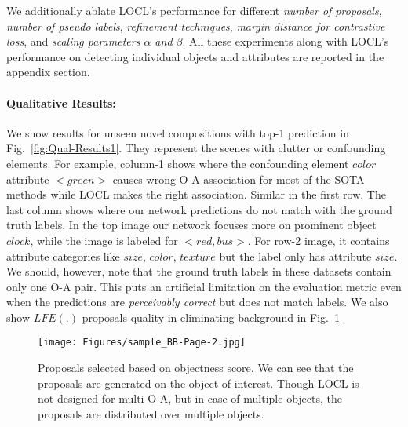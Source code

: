\documentclass{bmvc2k}
\begin{document}
We additionally ablate LOCL's performance for different \textit{number of proposals}, \textit{number of pseudo labels}, \textit{refinement techniques}, \textit{margin distance for contrastive loss}, and \textit{scaling parameters $\alpha$ and $\beta$}. All these experiments along with LOCL's performance on detecting individual objects and attributes are reported in the appendix section. 





\vspace{-0.3cm}
\paragraph{Qualitative Results:}
We show results for unseen novel compositions with top-1 prediction in Fig.~\ref{fig:Qual-Results1}. They represent the scenes with clutter or confounding elements.
For example, column-1 shows where the confounding element $color$ attribute $<green>$ causes wrong O-A association for most of the SOTA methods while LOCL makes the right association. Similar in the first row.
The last column shows where our network predictions do not match with the ground truth labels. 
In the top image our network focuses more on prominent object $clock$, while the image is labeled for $<red, bus>$.
For row-2 image, it contains attribute categories like $size$, $color$, $texture$ but the label only has attribute $size$. We should, however, note that the ground truth labels in these datasets contain only one O-A pair. 
This puts an artificial limitation on the evaluation metric even when the predictions are \textit{perceivably correct} but does not match labels.
We also show $LFE(.)$ proposals quality in eliminating background in Fig.~\ref{fig:samplebb2}

\vspace{-0.2cm}
\begin{figure}[t]
\begin{center}
\texttt{[image: Figures/sample\_BB-Page-2.jpg]}
\end{center}
  \vspace{-0.25in}
   \caption{Proposals selected based on objectness score. We can see that the proposals are generated on the object of interest. Though LOCL is not designed for multi O-A, but in case of multiple objects, the proposals are distributed over multiple objects.}
   \vspace{-0.25cm}
\label{fig:samplebb2}
\end{figure}
\end{document}
